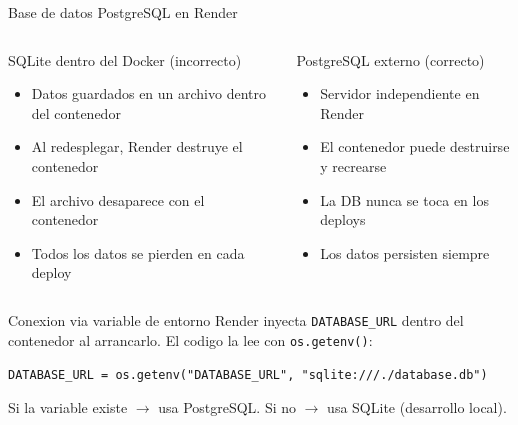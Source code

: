 \documentclass[aspectratio=169]{beamer}
\begin{document}
\begin{frame}{Base de datos PostgreSQL en Render}
  \begin{columns}
    \begin{alertblock}{SQLite dentro del Docker (incorrecto)}
      \begin{itemize}
        \item Datos guardados en un archivo dentro del contenedor
        \item Al redesplegar, Render destruye el contenedor
        \item El archivo desaparece con el contenedor
        \item Todos los datos se pierden en cada deploy
      \end{itemize}
    \end{alertblock}

    \begin{exampleblock}{PostgreSQL externo (correcto)}
      \begin{itemize}
        \item Servidor independiente en Render
        \item El contenedor puede destruirse y recrearse
        \item La DB nunca se toca en los deploys
        \item Los datos persisten siempre
      \end{itemize}
    \end{exampleblock}
  \end{columns}

  \vspace{0.4cm}

  \begin{block}{Conexion via variable de entorno}
    Render inyecta \texttt{DATABASE\_URL} dentro del contenedor al arrancarlo. El codigo la lee con \texttt{os.getenv()}:

    \vspace{0.2cm}
    \texttt{DATABASE\_URL = os.getenv("DATABASE\_URL", "sqlite:///./database.db")}

    \vspace{0.1cm}
    {\small Si la variable existe $\rightarrow$ usa PostgreSQL. Si no $\rightarrow$ usa SQLite (desarrollo local).}
  \end{block}
\end{frame}
\end{document}
